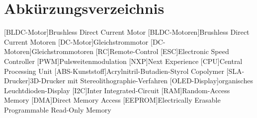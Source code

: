 

\pagestyle {fancy}
\rhead{\thepage} \chead{} 
\cfoot{}

\section*{Abkürzungsverzeichnis}

\begin{acronym}
	[BLDC-Motor]{Brushless Direct Current Motor}
	[BLDC-Motoren]{Brushless Direct Current Motoren}
	[DC-Motor]{Gleich\-strom\-motor}
	[DC-Motoren]{Gleich\-strom\-motoren}
	[RC]{Remote-Control}
	[ESC]{Electronic Speed Controller}
	[PWM]{Puls\-weiten\-modulation}
	[NXP]{Next Experience}
	[CPU]{Central Processing Unit}
	[ABS-Kunststoff]{Acrylnitril-Butadien-Styrol Copolymer}
	[SLA-Drucker]{3D-Drucker mit Stereolithographie-Verfahren}
	[OLED-Display]{organisches Leuchtdioden-Display}
	[I2C]{Inter Integrated-Circuit}
	[RAM]{Random-Access Memory}
	[DMA]{Direct Memory Access}
	[EEPROM]{Electrically Erasable Programmable Read-Only Memory}
\end{acronym}

\newpage
